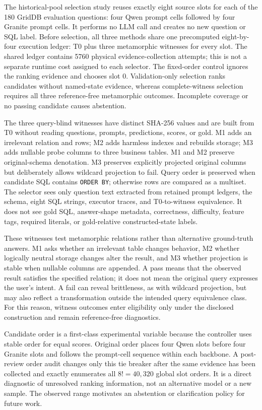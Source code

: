 \documentclass[information,article,submit,moreauthors]{Definitions/mdpi}
\begin{document}
The historical-pool selection study reuses exactly eight source slots for each of the 180 GridDB evaluation questions: four Qwen prompt cells followed by four Granite prompt cells. It performs no LLM call and creates no new question or SQL label. Before selection, all three methods share one precomputed eight-by-four execution ledger: T0 plus three metamorphic witnesses for every slot. The shared ledger contains 5760 physical evidence-collection attempts; this is not a separate runtime cost assigned to each selector. The fixed-order control ignores the ranking evidence and chooses slot 0. Validation-only selection ranks candidates without named-state evidence, whereas complete-witness selection requires all three reference-free metamorphic outcomes. Incomplete coverage or no passing candidate causes abstention.

The three query-blind witnesses have distinct SHA-256 values and are built from T0 without reading questions, prompts, predictions, scores, or gold. M1 adds an irrelevant relation and rows; M2 adds harmless indexes and rebuilds storage; M3 adds nullable probe columns to three business tables. M1 and M2 preserve original-schema denotation. M3 preserves explicitly projected original columns but deliberately allows wildcard projection to fail. Query order is preserved when candidate SQL contains \texttt{ORDER BY}; otherwise rows are compared as a multiset. The selector sees only question text extracted from retained prompt ledgers, the schema, eight SQL strings, executor traces, and T0-to-witness equivalence. It does not see gold SQL, answer-shape metadata, correctness, difficulty, feature tags, required literals, or gold-relative constructed-state labels.

These witnesses test metamorphic relations rather than alternative ground-truth answers. M1 asks whether an irrelevant table changes behavior, M2 whether logically neutral storage changes alter the result, and M3 whether projection is stable when nullable columns are appended. A pass means that the observed result satisfies the specified relation; it does not mean the original query expresses the user's intent. A fail can reveal brittleness, as with wildcard projection, but may also reflect a transformation outside the intended query equivalence class. For this reason, witness outcomes enter eligibility only under the disclosed construction and remain reference-free diagnostics.

Candidate order is a first-class experimental variable because the controller uses stable order for equal scores. Original order places four Qwen slots before four Granite slots and follows the prompt-cell sequence within each backbone. A post-review order audit changes only this tie breaker after the same evidence has been collected and exactly enumerates all $8!=40{,}320$ global slot orders. It is a direct diagnostic of unresolved ranking information, not an alternative model or a new sample. The observed range motivates an abstention or clarification policy for future work.
\end{document}
